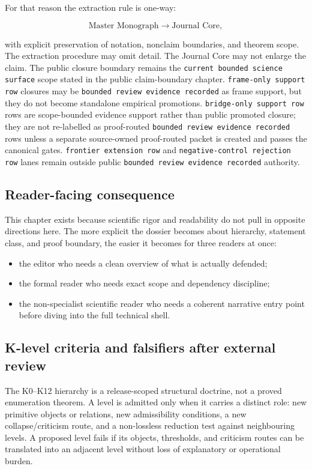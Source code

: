 For that reason the extraction rule is one-way:

\[
\text{Master Monograph} \longrightarrow \text{Journal Core},
\]

with explicit preservation of notation, nonclaim boundaries, and theorem scope.
The extraction procedure may omit detail. The Journal Core may not enlarge the
claim.
The public closure boundary remains the
\texttt{current bounded science surface} scope stated in
the public claim-boundary chapter. \texttt{frame-only support row} closures
may be \texttt{bounded review evidence recorded} as frame support, but they do not become standalone
empirical promotions. \texttt{bridge-only support row} rows are scope-bounded evidence
support rather than public promoted closure; they are not re-labelled as
proof-routed \texttt{bounded review evidence recorded} rows unless a separate source-owned
proof-routed packet is created and passes the canonical gates. \texttt{frontier extension row} and
\texttt{negative-control rejection row} lanes remain outside public \texttt{bounded review evidence recorded} authority.

\subsection{Reader-facing consequence}

This chapter exists because scientific rigor and readability do not pull in
opposite directions here.
The more explicit the dossier becomes about hierarchy, statement class, and
proof boundary, the easier it becomes for three readers at once:

\begin{itemize}
\item the editor who needs a clean overview of what is actually defended;
\item the formal reader who needs exact scope and dependency discipline;
\item the non-specialist scientific reader who needs a coherent narrative entry
      point before diving into the full technical shell.
\end{itemize}


\subsection{K-level criteria and falsifiers after external review}
\label{sec:oc13-k-level-criteria-v3}

The K0--K12 hierarchy is a release-scoped structural doctrine, not a proved
enumeration theorem. A level is admitted only when it carries a distinct role:
new primitive objects or relations, new admissibility conditions, a new
collapse/criticism route, and a non-lossless reduction test against neighbouring
levels. A proposed level fails if its objects, thresholds, and criticism routes can
be translated into an adjacent level without loss of explanatory or operational
burden.

